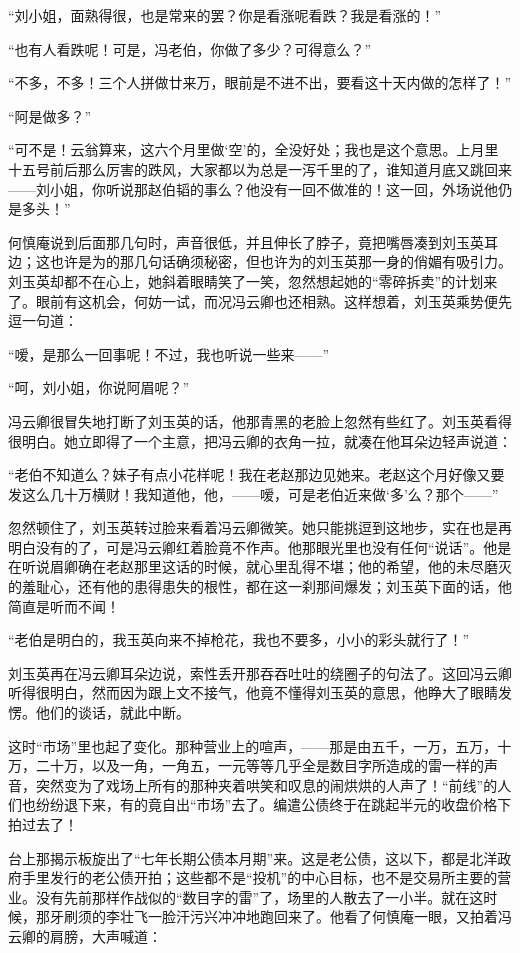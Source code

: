 \par “刘小姐，面熟得很，也是常来的罢？你是看涨呢看跌？我是看涨的！”
\par “也有人看跌呢！可是，冯老伯，你做了多少？可得意么？”
\par “不多，不多！三个人拼做廿来万，眼前是不进不出，要看这十天内做的怎样了！”
\par “阿是做多？”
\par “可不是！云翁算来，这六个月里做‘空’的，全没好处；我也是这个意思。上月里十五号前后那么厉害的跌风，大家都以为总是一泻千里的了，谁知道月底又跳回来——刘小姐，你听说那赵伯韬的事么？他没有一回不做准的！这一回，外场说他仍是多头！”
\par 何慎庵说到后面那几句时，声音很低，并且伸长了脖子，竟把嘴唇凑到刘玉英耳边；这也许是为的那几句话确须秘密，但也许为的刘玉英那一身的俏媚有吸引力。刘玉英却都不在心上，她斜着眼睛笑了一笑，忽然想起她的“零碎拆卖”的计划来了。眼前有这机会，何妨一试，而况冯云卿也还相熟。这样想着，刘玉英乘势便先逗一句道：
\par “嗳，是那么一回事呢！不过，我也听说一些来——”
\par “呵，刘小姐，你说阿眉呢？”
\par 冯云卿很冒失地打断了刘玉英的话，他那青黑的老脸上忽然有些红了。刘玉英看得很明白。她立即得了一个主意，把冯云卿的衣角一拉，就凑在他耳朵边轻声说道：
\par “老伯不知道么？妹子有点小花样呢！我在老赵那边见她来。老赵这个月好像又要发这么几十万横财！我知道他，他，——嗳，可是老伯近来做‘多’么？那个——”
\par 忽然顿住了，刘玉英转过脸来看着冯云卿微笑。她只能挑逗到这地步，实在也是再明白没有的了，可是冯云卿红着脸竟不作声。他那眼光里也没有任何“说话”。他是在听说眉卿确在老赵那里这话的时候，就心里乱得不堪；他的希望，他的未尽磨灭的羞耻心，还有他的患得患失的根性，都在这一刹那间爆发；刘玉英下面的话，他简直是听而不闻！
\par “老伯是明白的，我玉英向来不掉枪花，我也不要多，小小的彩头就行了！”
\par 刘玉英再在冯云卿耳朵边说，索性丢开那吞吞吐吐的绕圈子的句法了。这回冯云卿听得很明白，然而因为跟上文不接气，他竟不懂得刘玉英的意思，他睁大了眼睛发愣。他们的谈话，就此中断。
\par 这时“市场”里也起了变化。那种营业上的喧声，——那是由五千，一万，五万，十万，二十万，以及一角，一角五，一元等等几乎全是数目字所造成的雷一样的声音，突然变为了戏场上所有的那种夹着哄笑和叹息的闹烘烘的人声了！“前线”的人们也纷纷退下来，有的竟自出“市场”去了。编遣公债终于在跳起半元的收盘价格下拍过去了！
\par 台上那揭示板旋出了“七年长期公债本月期”来。这是老公债，这以下，都是北洋政府手里发行的老公债开拍；这些都不是“投机”的中心目标，也不是交易所主要的营业。没有先前那样作战似的“数目字的雷”了，场里的人散去了一小半。就在这时候，那牙刷须的李壮飞一脸汗污兴冲冲地跑回来了。他看了何慎庵一眼，又拍着冯云卿的肩膀，大声喊道：

